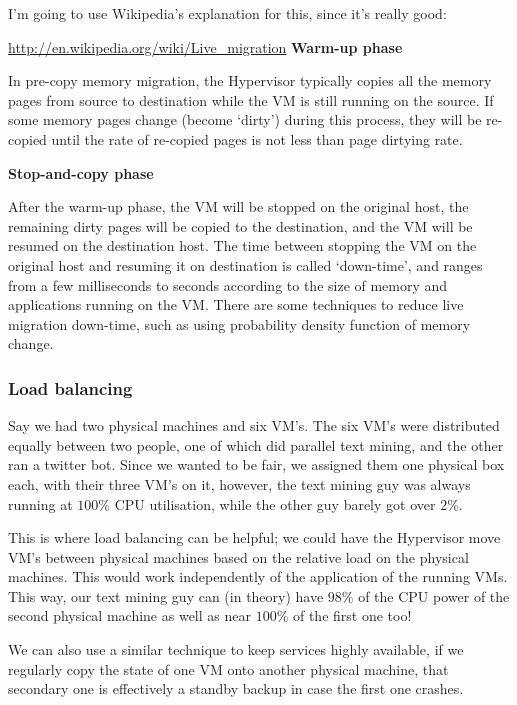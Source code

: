 I'm going to use Wikipedia's explanation for this, since it's really good:

\begin{aquote}{\url{http://en.wikipedia.org/wiki/Live_migration}}
  \textbf{Warm-up phase}
  
  In pre-copy memory migration, the Hypervisor typically copies all the memory
  pages from source to destination while the VM is still running on the source.
  If some memory pages change (become `dirty') during this process, they will be
  re-copied until the rate of re-copied pages is not less than page dirtying
  rate.

  \textbf{Stop-and-copy phase}

  After the warm-up phase, the VM will be stopped on the original host, the
  remaining dirty pages will be copied to the destination, and the VM will be
  resumed on the destination host. The time between stopping the VM on the
  original host and resuming it on destination is called `down-time', and ranges
  from a few milliseconds to seconds according to the size of memory and
  applications running on the VM. There are some techniques to reduce live
  migration down-time, such as using probability density function of memory
  change.
\end{aquote}

\subsubsection{Load balancing}

Say we had two physical machines and six VM's. The six VM's were distributed
equally between two people, one of which did parallel text mining, and the other
ran a twitter bot. Since we wanted to be fair, we assigned them one physical box
each, with their three VM's on it, however, the text mining guy was always
running at $100\%$ CPU utilisation, while the other guy barely got over $2\%$.

This is where load balancing can be helpful; we could have the Hypervisor move
VM's between physical machines based on the relative load on the physical
machines. This would work independently of the application of the running VMs.
This way, our text mining guy can (in theory) have $98\%$ of the CPU power of
the second physical machine as well as near $100\%$ of the first one too!

We can also use a similar technique to keep services highly available, if we
regularly copy the state of one VM onto another physical machine, that secondary
one is effectively a standby backup in case the first one crashes.

